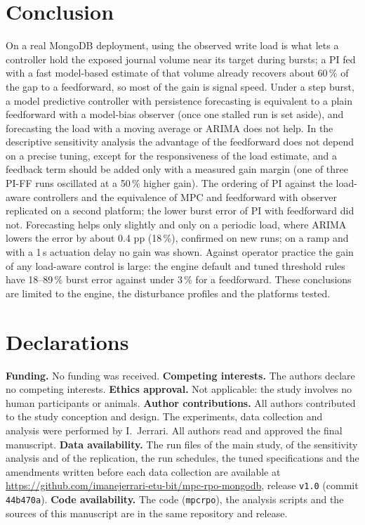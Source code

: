 \documentclass[smallextended]{svjour3}
\newcommand{\repoRef}{ (commit \texttt{44b470a})}
\begin{document}
\section{Conclusion}\label{sec:conclusion}
On a real MongoDB deployment, using the observed write load is what lets a controller hold the exposed journal volume near its target during bursts; a PI fed with a fast model-based estimate of that volume already recovers about 60\,\% of the gap to a feedforward, so most of the gain is signal speed. Under a step burst, a model predictive controller with persistence forecasting is equivalent to a plain
feedforward with a model-bias observer (once one stalled run is set aside), and forecasting the load with a moving average or ARIMA does not help. In the descriptive sensitivity analysis the advantage of the feedforward does not depend on a precise tuning, except for the responsiveness of the load estimate, and a feedback term should be added only with a measured gain margin (one of three PI-FF runs oscillated at a 50\,\% higher gain). The ordering of PI against the load-aware controllers and the equivalence of MPC and feedforward with observer replicated on a second platform; the lower burst error of PI with feedforward did not. Forecasting helps only slightly and only on a periodic load, where ARIMA lowers the error by about 0.4 pp (18\,\%), confirmed on new runs; on a ramp and with a 1\,s actuation delay no gain was shown. Against operator practice the gain of any load-aware control is large: the engine default and tuned threshold rules have 18--89\,\% burst error against under 3\,\% for a feedforward. These conclusions are limited to the engine, the disturbance profiles and the platforms tested.

\section*{Declarations}
\textbf{Funding.} No funding was received. \textbf{Competing interests.} The authors declare no competing interests.
\textbf{Ethics approval.} Not applicable: the study involves no human participants or animals.
\textbf{Author contributions.} All authors contributed to the study conception and design. The experiments, data collection and analysis were performed by I.~Jerrari. All authors read and approved the final manuscript.
\textbf{Data availability.} The run files of the main study, of the sensitivity analysis and of the replication, the run schedules, the tuned specifications and the amendments written before each data collection are available at
\url{https://github.com/imanejerrari-etu-bit/mpc-rpo-mongodb}, release \texttt{v1.0}\repoRef.
\textbf{Code availability.} The code (\texttt{mpcrpo}), the analysis scripts and the sources of this manuscript are in the same repository and release.
\end{document}
